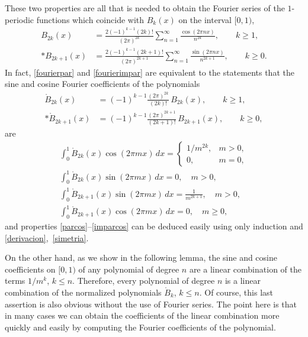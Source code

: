 \documentclass[a4paper,reqno]{amsart}
\theoremstyle{plain}
\numberwithin{equation}{section}
\theoremstyle{remark}
\begin{document}
These two properties are all that is needed to obtain the Fourier series of the $1$-periodic functions which coincide with $B_k(x)$ on the interval $[0,1)$,
\begin{align}
\label{fourierpar}
  B_{2k}(x) &= \frac{2 (-1)^{k-1} (2k)!}{(2\pi)^{2k}}
    \sum_{n=1}^\infty \frac{\cos(2\pi n x)}{n^{2k}},
  \qquad k \ge 1,
  \\*
\label{fourierimpar}
  B_{2k+1}(x) &= \frac{2 (-1)^{k-1} (2k+1)!}{(2\pi)^{2k+1}}
    \sum_{n=1}^\infty \frac{\sin(2\pi n x)}{n^{2k+1}},
  \qquad k \ge 0.
\end{align}
In fact, \eqref{fourierpar} and \eqref{fourierimpar} are equivalent to the statements that the sine and cosine Fourier coefficients of the polynomials
\begin{align*}
 \mathring{B}_{2k}(x) &= (-1)^{k-1} \frac{(2\pi)^{2k}}{(2k)!}\,B_{2k}(x), 
 \qquad k\geq 1,
  \\*
  \mathring{B}_{2k+1}(x) &= (-1)^{k-1} \frac{(2\pi)^{2k+1}}{(2k+1)!}\,B_{2k+1}(x),
  \qquad k\geq 0,
\end{align*}
are
\begin{gather}
\label{parcos}
  \int_0^1 \mathring{B}_{2k}(x) \cos(2\pi mx)\,dx = 
  \begin{cases}
   1/m^{2k}, & {m>0,} \\
    0, & {m = 0,}
  \end{cases}
  \\
\label{parsin}
  \int_0^1 \mathring{B}_{2k}(x) \sin(2\pi mx)\,dx = 0,\quad m>0,
  \\
\label{imparsin}
  \int_0^1 \mathring{B}_{2k+1}(x) \sin(2\pi mx)\,dx = \frac{1}{m^{2k+1}},\quad m>0,
  \\
\label{imparcos}
\int_0^1 \mathring{B}_{2k+1}(x) \cos(2\pi mx)\,dx = 0,\quad m\geq 0,
\end{gather}
and properties \eqref{parcos}--\eqref{imparcos} can be deduced easily using only induction and \eqref{derivacion},~\eqref{simetria}.

On the other hand, as we show in the following lemma, the sine and cosine coefficients on $[0,1)$ of any polynomial of degree $n$ are a linear combination of the terms $1/m^k$, $k\leq n$. Therefore, every polynomial of degree $n$ is a linear combination of the normalized polynomials $\mathring{B}_{k}$, $k\leq n$. Of course, this last assertion is also obvious without the use of Fourier series. The point here is that in many cases we can obtain the coefficients of the linear combination more quickly and easily by computing the Fourier coefficients of the polynomial.
\end{document}
